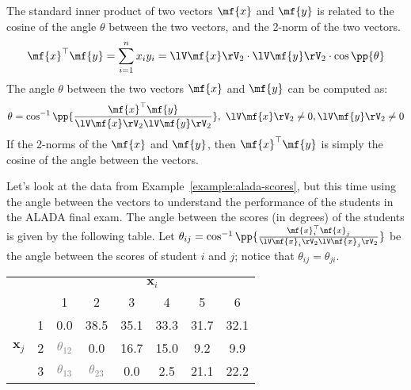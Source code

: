 The standard inner product of two vectors $\mf{x}$ and $\mf{y}$ is related to the cosine of the angle $\theta$ between the two vectors, and the 2-norm of the two vectors.
\[ \mf{x}^\top\mf{y} = \sum_{i=1}^n x_i y_i = \lV \mf{x} \rV_2 \cdot \lV \mf{y} \rV_2 \cdot \cos\pp{\theta} \]
The angle $\theta$ between the two vectors $\mf{x}$ and $\mf{y}$ can be computed as:
\[ \theta = \cos^{-1}\pp{\frac{\mf{x}^\top \mf{y}}{\lV \mf{x} \rV_2 \lV \mf{y} \rV_2}}, \,\, \lV \mf{x} \rV_2 \neq 0, \lV \mf{y} \rV_2 \neq 0 \]
If the 2-norms of the $\mf{x}$ and $\mf{y}$, then $\mf{x}^\top\mf{y}$ is simply the cosine of the angle between the vectors.

\begin{boxedstuff}
    \begin{example}
        Let's look at the data from Example~\ref{example:alada-scores}, but this time using the angle between the vectors to understand the performance of the students in the ALADA final exam. The angle between the scores (in degrees) of the students is given by the following table. Let $\theta_{ij} = \cos^{-1}\pp{\frac{\mf{x}_i^\top\mf{x}_j}{\lV \mf{x}_i \rV_2 \lV \mf{x}_j \rV_2}}$ be the angle between the scores of student $i$ and $j$; notice that $\theta_{ij} = \theta_{ji}$.
        \begin{small}
            \begin{center}
            \begin{tabular}{lc|cccccc|}
                \cline{3-8}
                & \multicolumn{1}{l|}{} & \multicolumn{6}{c|}{$\mathbf{x}_i$} \\ \cline{3-8} 
                &  & \multicolumn{1}{c|}{1} & \multicolumn{1}{c|}{2} & \multicolumn{1}{c|}{3} & \multicolumn{1}{c|}{4} & \multicolumn{1}{c|}{5} & 6 \\ \hline
                \multicolumn{1}{|l|}{\multirow{6}{*}{$\mathbf{x}_j$}} & 1 & \multicolumn{1}{c|}{0.0} & \multicolumn{1}{c|}{38.5} & \multicolumn{1}{c|}{35.1} & \multicolumn{1}{c|}{33.3} & \multicolumn{1}{c|}{31.7} & 32.1 \\ \cline{2-8} 
                \multicolumn{1}{|l|}{} & 2 & \multicolumn{1}{c|}{\textcolor{gray}{$\theta_{12}$}} & \multicolumn{1}{c|}{0.0} & \multicolumn{1}{c|}{16.7} & \multicolumn{1}{c|}{15.0} & \multicolumn{1}{c|}{9.2} & 9.9 \\ \cline{2-8} 
                \multicolumn{1}{|l|}{} & 3 & \multicolumn{1}{c|}{\textcolor{gray}{$\theta_{13}$}} & \multicolumn{1}{c|}{\textcolor{gray}{$\theta_{23}$}} & \multicolumn{1}{c|}{0.0} & \multicolumn{1}{c|}{2.5} & \multicolumn{1}{c|}{21.1} & 22.2 \\ \cline{2-8} 

\end{tabular}
\end{center}
\end{small}
\end{example}
\end{boxedstuff}
